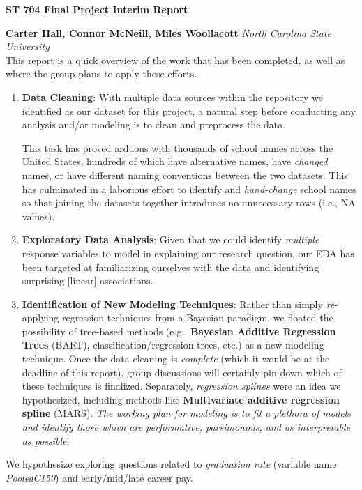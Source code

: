 \documentclass[a4paper,10pt]{article}
\begin{document}
\noindent 
\begin{center}
\textbf{{\Large ST 704 Final Project Interim Report}} \\
\end{center}

\noindent 
\textbf{Carter Hall, Connor McNeill, Miles Woollacott} \textit{North Carolina State University}
\\

\noindent
This report is a quick overview of the work that has been completed, as well as where the group plans to apply these efforts.
\begin{enumerate}
    \item \textbf{Data Cleaning}: With multiple data sources within the repository we identified as our dataset for this project, a natural step before conducting any analysis and/or modeling is to clean and preprocess the data. 

    This task has proved arduous with thousands of school names across the United States, hundreds of which have alternative names, have \textit{changed} names, or have different naming conventions between the two datasets. This has culminated in a laborious effort to identify and \textit{hand-change} school names so that joining the datasets together introduces no unnecessary rows (i.e., NA values).  
    \item \textbf{Exploratory Data Analysis}: Given that we could identify \textit{multiple} response variables to model in explaining our research question, our EDA has been targeted at familiarizing ourselves with the data and identifying surprising [linear] associations. 
    \item \textbf{Identification of New Modeling Techniques}: Rather than simply \textit{re}-applying regression techniques from a Bayesian paradigm, we floated the possibility of tree-based methods (e.g., \textbf{Bayesian Additive Regression Trees} (BART), classification/regression trees, etc.) as a new modeling technique. Once the data cleaning is \textit{complete} (which it would be at the deadline of this report), group discussions will certainly pin down which of these techniques is finalized. Separately, \textit{regression splines} were an idea we hypothesized, including methods like \textbf{Multivariate additive regression spline} (MARS). \textit{The working plan for modeling is to fit a plethora of models and identify those which are performative, parsimonous, and as interpretable as possible}! 
\end{enumerate}
We hypothesize exploring questions related to \textit{graduation rate} (variable name \textit{PooledC150}) and early/mid/late career pay.
\\
\end{document}
